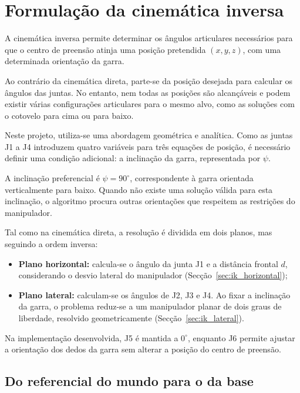 
\chapter{Formulação da cinemática inversa}
\label{ch:inv_kin}

A cinemática inversa permite determinar os ângulos articulares necessários para que o centro de preensão atinja uma posição pretendida $(x,y,z)$, com uma determinada orientação da garra.

Ao contrário da cinemática direta, parte-se da posição desejada para calcular os ângulos das juntas. No entanto, nem todas as posições são alcançáveis e podem existir várias configurações articulares para o mesmo alvo, como as soluções com o cotovelo para cima ou para baixo.

Neste projeto, utiliza-se uma abordagem geométrica e analítica. Como as juntas J1 a J4 introduzem quatro variáveis para três equações de posição, é necessário definir uma condição adicional: a inclinação da garra, representada por $\psi$.

A inclinação preferencial é $\psi=90^\circ$, correspondente à garra orientada verticalmente para baixo. Quando não existe uma solução válida para esta inclinação, o algoritmo procura outras orientações que respeitem as restrições do manipulador.

Tal como na cinemática direta, a resolução é dividida em dois planos, mas seguindo a ordem inversa:

\begin{itemize}
    \item \textbf{Plano horizontal:} calcula-se o ângulo da junta J1 e a distância frontal $d$, considerando o desvio lateral do manipulador (Secção~\ref{sec:ik_horizontal});

    \item \textbf{Plano lateral:} calculam-se os ângulos de J2, J3 e J4. Ao fixar a inclinação da garra, o problema reduz-se a um manipulador planar de dois graus de liberdade, resolvido geometricamente \cite{bicho_2dof,bicho_3dof} (Secção~\ref{sec:ik_lateral}).
\end{itemize}

Na implementação desenvolvida, J5 é mantida a $0^\circ$, enquanto J6 permite ajustar a orientação dos dedos da garra sem alterar a posição do centro de preensão.


\section{Do referencial do mundo para o da base}
\label{sec:mundo_base}

